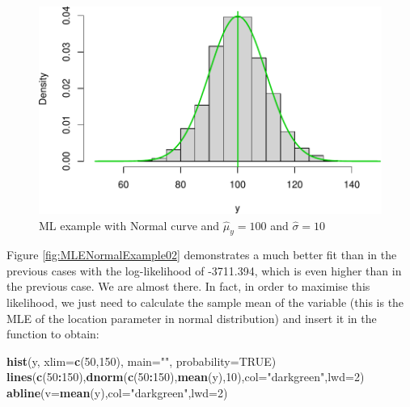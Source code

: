 \documentclass[
]{book}
\newenvironment{Shaded}{\begin{snugshade}}{\end{snugshade}}
\newcommand{\DataTypeTok}[1]{\textcolor[rgb]{0.13,0.29,0.53}{#1}}
\newcommand{\DecValTok}[1]{\textcolor[rgb]{0.00,0.00,0.81}{#1}}
\newcommand{\KeywordTok}[1]{\textcolor[rgb]{0.13,0.29,0.53}{\textbf{#1}}}
\newcommand{\NormalTok}[1]{#1}
\newcommand{\OperatorTok}[1]{\textcolor[rgb]{0.81,0.36,0.00}{\textbf{#1}}}
\newcommand{\OtherTok}[1]{\textcolor[rgb]{0.56,0.35,0.01}{#1}}
\newcommand{\StringTok}[1]{\textcolor[rgb]{0.31,0.60,0.02}{#1}}
\theoremstyle{definition}
\theoremstyle{definition}
\theoremstyle{definition}
\theoremstyle{definition}
\theoremstyle{remark}
\begin{document}
\begin{figure}
\centering
\includegraphics{Svetunkov---Statistics-for-Business-Analytics_files/figure-latex/MLENormalExample03-1.pdf}
\caption{\label{fig:MLENormalExample03}ML example with Normal curve and \(\hat{\mu}_y=100\) and \(\hat{\sigma}=10\)}
\end{figure}

Figure \ref{fig:MLENormalExample02} demonstrates a much better fit than in the previous cases with the log-likelihood of -3711.394, which is even higher than in the previous case. We are almost there. In fact, in order to maximise this likelihood, we just need to calculate the sample mean of the variable (this is the MLE of the location parameter in normal distribution) and insert it in the function to obtain:

\begin{Shaded}
\begin{Highlighting}[]
\KeywordTok{hist}\NormalTok{(y, }\DataTypeTok{xlim=}\KeywordTok{c}\NormalTok{(}\DecValTok{50}\NormalTok{,}\DecValTok{150}\NormalTok{), }\DataTypeTok{main=}\StringTok{""}\NormalTok{, }\DataTypeTok{probability=}\OtherTok{TRUE}\NormalTok{)}
\KeywordTok{lines}\NormalTok{(}\KeywordTok{c}\NormalTok{(}\DecValTok{50}\OperatorTok{:}\DecValTok{150}\NormalTok{),}\KeywordTok{dnorm}\NormalTok{(}\KeywordTok{c}\NormalTok{(}\DecValTok{50}\OperatorTok{:}\DecValTok{150}\NormalTok{),}\KeywordTok{mean}\NormalTok{(y),}\DecValTok{10}\NormalTok{),}\DataTypeTok{col=}\StringTok{"darkgreen"}\NormalTok{,}\DataTypeTok{lwd=}\DecValTok{2}\NormalTok{)}
\KeywordTok{abline}\NormalTok{(}\DataTypeTok{v=}\KeywordTok{mean}\NormalTok{(y),}\DataTypeTok{col=}\StringTok{"darkgreen"}\NormalTok{,}\DataTypeTok{lwd=}\DecValTok{2}\NormalTok{)}
\end{Highlighting}
\end{Shaded}
\end{document}
